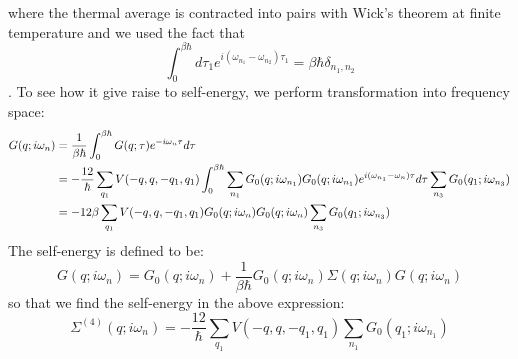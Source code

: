 \documentclass{article}
\begin{document}
where the thermal average is contracted into pairs with Wick's theorem at finite temperature and we used the fact that
\begin{equation}
    \int_0^{\beta\hbar} d\tau_1 e^{i(\omega_{n_1}-\omega_{n_2})\tau_1} = \beta\hbar \delta_{n_1,n_2}
\end{equation}.
To see how it give raise to self-energy, we perform transformation into frequency space:
\begin{align}
    G(q;i\omega_n) &= \frac{1}{\beta\hbar} \int_{0}^{\beta\hbar} G(q;\tau) e^{-i\omega_n\tau} d\tau \notag \\
        &= -\frac{12}{\hbar}\sum_{q_1} V(-q,q,-q_1,q_1) 
        \int_{0}^{\beta\hbar} \sum_{n_1} G_0(q;i\omega_{n_1}) G_0(q;i\omega_{n_1}) e^{i(\omega_{n_1}-\omega_n)\tau}  d\tau
        \sum_{n_3}G_0(q_1;i\omega_{n_3})  \notag \\
        &= -12\beta \sum_{q_1} V(-q,q,-q_1,q_1) G_0(q;i\omega_{n}) G_0(q;i\omega_{n})
        \sum_{n_3}G_0(q_1;i\omega_{n_3}) 
\end{align}
The self-energy is defined to be:
\begin{equation}
    G(q;i\omega_n) = G_0(q;i\omega_n) + \frac{1}{\beta\hbar} G_0(q;i\omega_n) \Sigma(q;i\omega_n) G(q;i\omega_n)
\end{equation}
so that we find the self-energy in the above expression:
\begin{equation}
    \Sigma^{(4)}(q;i\omega_n) = -\frac{12}{\hbar} \sum_{q_1} V(-q,q,-q_1,q_1) \sum_{n_1}G_0(q_1;i\omega_{n_1}) 
\end{equation}
\end{document}
